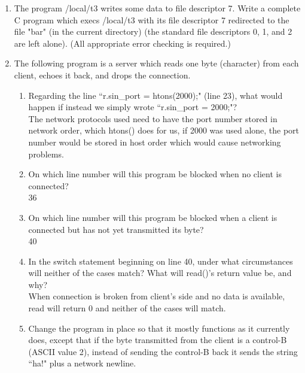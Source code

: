 \documentclass[11pt]{article}
\begin{document}
\begin{enumerate}
	\newpage
	\item The program /local/t3 writes some data to file descriptor 7. Write a complete C program which execs /local/t3 with its file descriptor 7 redirected to the file "bar" (in the current directory) (the standard file descriptors 0, 1, and 2 are left alone). (All appropriate error checking is required.)
		
		
	\newpage
	\item The following program is a server which reads one byte (character) from each client, echoes it
	back, and drops the connection.
	
	\newpage
	\begin{enumerate}
		\item  Regarding the line ``r.sin\_port = htons(2000);" (line 23), what would happen if instead we simply wrote ``r.sin\_port = 2000;"?\\
		The network protocols used need to have the port number stored in network order, which htons() does for us, if 2000 was used alone, the port number would be stored in host order which would cause networking problems.
		\item On which line number will this program be blocked when no client is connected?\\
		36
		\item On which line number will this program be blocked when a client is connected but has not yet transmitted its byte?\\
		40
		\item In the switch statement beginning on line 40, under what circumstances will neither of the cases match? What will read()'s return value be, and why?\\
		When connection is broken from client's side and no data is available, read will return 0 and neither of the cases will match.
		\item Change the program in place so that it mostly functions as it currently does, except that if the byte transmitted from the client is a control-B (ASCII value 2), instead of sending the control-B back it sends the string ``ha!" plus a network newline.
		
	\end{enumerate}
	
\end{enumerate}
\end{document}
